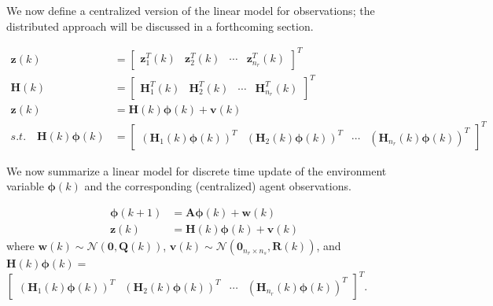We now define a centralized version of the linear model for observations; the distributed approach will be discussed in a forthcoming section.

\begin{align}
    \mathbf{z}(k) &= \begin{bmatrix} \mathbf{z}_1^T(k) & \mathbf{z}_2^T(k) & \cdots & \mathbf{z}_{n_r}^T(k) \end{bmatrix}^T \\
    \mathbf{H}(k) &= \begin{bmatrix} \mathbf{H}_1^T(k) & \mathbf{H}_2^T(k) & \cdots & \mathbf{H}_{n_r}^T(k) \end{bmatrix}^T \\
    \mathbf{z}(k) &= \mathbf{H}(k)\bm{\phi}(k) + \mathbf{v}(k)\\
    s.t.\quad \mathbf{H}(k)\bm{\phi}(k) &= \begin{bmatrix} \left(\mathbf{H}_1(k)\bm{\phi}(k)\right)^T & \left(\mathbf{H}_2(k)\bm{\phi}(k)\right)^T & \cdots & \left(\mathbf{H}_{n_r}(k)\bm{\phi}(k)\right)^T\end{bmatrix}^T
\end{align}

We now summarize a linear model for discrete time update of the environment variable $\bm{\phi}(k)$ and the corresponding (centralized) agent observations.

\begin{align}
    \bm{\phi}(k+1) &= \mathbf{A}\bm{\phi}(k) + \mathbf{w}(k) \\
    \mathbf{z}(k) &= \mathbf{H}(k)\bm{\phi}(k) + \mathbf{v}(k)
\end{align}
where $\mathbf{w}(k)\sim\mathcal{N}(\mathbf{0},\mathbf{Q}(k))$, $\mathbf{v}(k)\sim\mathcal{N}(\mathbf{0}_{n_r\times n_s},\mathbf{R}(k))$, and $\mathbf{H}(k)\bm{\phi}(k) =$ \\ $\begin{bmatrix} \left(\mathbf{H}_1(k)\bm{\phi}(k)\right)^T & \left(\mathbf{H}_2(k)\bm{\phi}(k)\right)^T & \cdots & \left(\mathbf{H}_{n_r}(k)\bm{\phi}(k)\right)^T\end{bmatrix}^T$.


